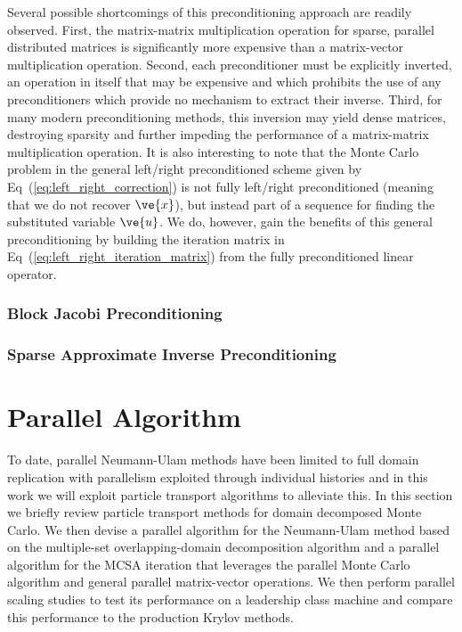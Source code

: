 \documentclass[letterpaper,11pt]{article}
\begin{document}
Several possible shortcomings of this preconditioning approach are
readily observed. First, the matrix-matrix multiplication operation
for sparse, parallel distributed matrices is significantly more
expensive than a matrix-vector multiplication operation. Second, each
preconditioner must be explicitly inverted, an operation in itself
that may be expensive and which prohibits the use of any
preconditioners which provide no mechanism to extract their
inverse. Third, for many modern preconditioning methods, this
inversion may yield dense matrices, destroying sparsity and further
impeding the performance of a matrix-matrix multiplication
operation. It is also interesting to note that the Monte Carlo problem
in the general left/right preconditioned scheme given by
Eq~(\ref{eq:left_right_correction}) is not fully left/right
preconditioned (meaning that we do not recover $\ve{x}$), but instead
part of a sequence for finding the substituted variable $\ve{u}$. We
do, however, gain the benefits of this general preconditioning by
building the iteration matrix in
Eq~(\ref{eq:left_right_iteration_matrix}) from the fully
preconditioned linear operator.

\subsubsection{Block Jacobi Preconditioning}

\subsubsection{Sparse Approximate Inverse Preconditioning}

\section{Parallel Algorithm}
\label{sec:parallel_mcsa}
To date, parallel Neumann-Ulam methods have been limited to full
domain replication with parallelism exploited through individual
histories \cite{alexandrov_efficient_1998} and in this work we will
exploit particle transport algorithms to alleviate this. In this
section we briefly review particle transport methods for domain
decomposed Monte Carlo. We then devise a parallel algorithm for the
Neumann-Ulam method based on the multiple-set overlapping-domain
decomposition algorithm and a parallel algorithm for the MCSA
iteration that leverages the parallel Monte Carlo algorithm and
general parallel matrix-vector operations. We then perform parallel
scaling studies to test its performance on a leadership class machine
and compare this performance to the production Krylov methods.
\end{document}
